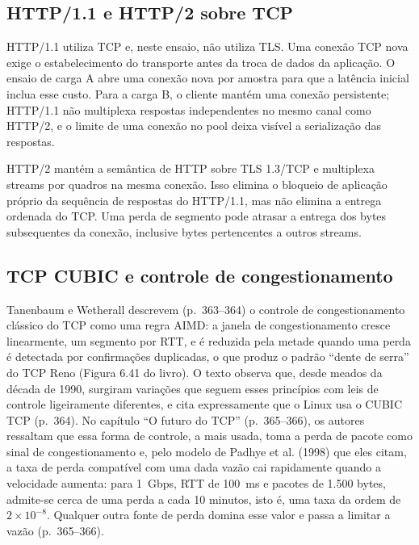 \documentclass[12pt,a4paper]{article}
\begin{document}
\subsection{HTTP/1.1 e HTTP/2 sobre TCP}

HTTP/1.1 utiliza TCP e, neste ensaio, não utiliza TLS. Uma conexão TCP nova exige o
estabelecimento do transporte antes da troca de dados da aplicação. O ensaio de carga A
abre uma conexão nova por amostra para que a latência inicial inclua esse custo. Para a
carga B, o cliente mantém uma conexão persistente; HTTP/1.1 não multiplexa respostas
independentes no mesmo canal como HTTP/2, e o limite de uma conexão no pool deixa visível
a serialização das respostas.

HTTP/2 mantém a semântica de HTTP sobre TLS 1.3/TCP e multiplexa streams por quadros na
mesma conexão. Isso elimina o bloqueio de aplicação próprio da sequência de respostas do
HTTP/1.1, mas não elimina a entrega ordenada do TCP. Uma perda de segmento pode atrasar
a entrega dos bytes subsequentes da conexão, inclusive bytes pertencentes a outros streams.

\subsection{TCP CUBIC e controle de congestionamento}

Tanenbaum e Wetherall \cite{tanenbaum} descrevem (p.~363--364) o controle de
congestionamento clássico do TCP como uma regra AIMD: a janela de congestionamento cresce
linearmente, um segmento por RTT, e é reduzida pela metade quando uma perda é detectada por
confirmações duplicadas, o que produz o padrão ``dente de serra'' do TCP Reno (Figura 6.41 do
livro). O texto observa que, desde meados da década de 1990, surgiram variações que seguem
esses princípios com leis de controle ligeiramente diferentes, e cita expressamente que o
Linux usa o CUBIC TCP \cite{ha2008} (p.~364). No capítulo ``O futuro do TCP''
(p.~365--366), os autores ressaltam que essa forma de controle, a mais usada, toma a perda de
pacote como sinal de congestionamento e, pelo modelo de Padhye et al. (1998) que eles citam,
a taxa de perda compatível com uma dada vazão cai rapidamente quando a velocidade aumenta:
para 1~Gbps, RTT de 100~ms e pacotes de 1.500 bytes, admite-se cerca de uma perda a cada 10
minutos, isto é, uma taxa da ordem de $2\times10^{-8}$. Qualquer outra fonte de perda
domina esse valor e passa a limitar a vazão (p.~365--366).
\end{document}
